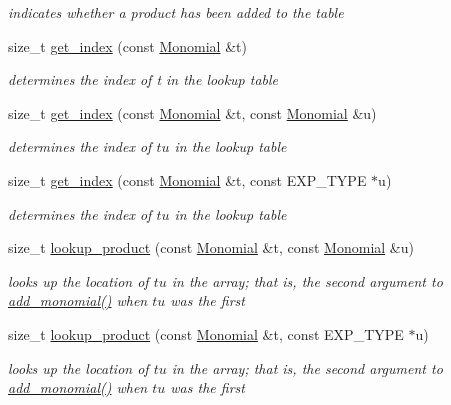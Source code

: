\begin{DoxyCompactItemize}
\begin{DoxyCompactList}\small\item\em indicates whether a product has been added to the table \end{DoxyCompactList}\item 
size\+\_\+t \hyperlink{group___g_b_computation_a7b22f6999f276e58087fe668a01f240a}{get\+\_\+index} (const \hyperlink{group__polygroup_class_monomial}{Monomial} \&t)
\begin{DoxyCompactList}\small\item\em determines the index of {\ttfamily t} in the lookup table \end{DoxyCompactList}\item 
size\+\_\+t \hyperlink{group___g_b_computation_a12cff698cefa0375ab76ee6c36a0ce6c}{get\+\_\+index} (const \hyperlink{group__polygroup_class_monomial}{Monomial} \&t, const \hyperlink{group__polygroup_class_monomial}{Monomial} \&u)
\begin{DoxyCompactList}\small\item\em determines the index of $tu$ in the lookup table \end{DoxyCompactList}\item 
size\+\_\+t \hyperlink{group___g_b_computation_aa7035dafc727cfb078fea49e8bbd011c}{get\+\_\+index} (const \hyperlink{group__polygroup_class_monomial}{Monomial} \&t, const E\+X\+P\+\_\+\+T\+Y\+PE $\ast$u)
\begin{DoxyCompactList}\small\item\em determines the index of $tu$ in the lookup table \end{DoxyCompactList}\item 
size\+\_\+t \hyperlink{group___g_b_computation_a539f858e09579b9119941795e42cdc4f}{lookup\+\_\+product} (const \hyperlink{group__polygroup_class_monomial}{Monomial} \&t, const \hyperlink{group__polygroup_class_monomial}{Monomial} \&u)
\begin{DoxyCompactList}\small\item\em looks up the location of $tu$ in the array; that is, the second argument to {\ttfamily \hyperlink{group___g_b_computation_aaed2c308a7d79e098e6555d20b1720d0}{add\+\_\+monomial()}} when $tu$ was the first \end{DoxyCompactList}\item 
size\+\_\+t \hyperlink{group___g_b_computation_a9eef1cd0bf6fd57e97b6d10d42b3c6d2}{lookup\+\_\+product} (const \hyperlink{group__polygroup_class_monomial}{Monomial} \&t, const E\+X\+P\+\_\+\+T\+Y\+PE $\ast$u)
\begin{DoxyCompactList}\small\item\em looks up the location of $tu$ in the array; that is, the second argument to {\ttfamily \hyperlink{group___g_b_computation_aaed2c308a7d79e098e6555d20b1720d0}{add\+\_\+monomial()}} when $tu$ was the first \end{DoxyCompactList}\item 

\end{DoxyCompactItemize}
